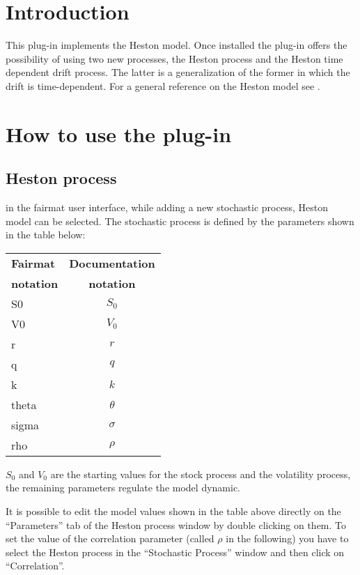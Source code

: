 \newcommand{\pluginName}{Heston Model}
\newcommand{\pluginVersion}{1.0.9}





\PluginTitle{\pluginName}{\pluginVersion}

\section{Introduction}
This plug-in implements the Heston model. Once installed the plug-in offers the possibility of using two new processes, the Heston process and the Heston time dependent drift process. 
The latter is a generalization of the former in which the drift is time-dependent. For a general reference on the Heston model see \cite{Heston:ClosedFormSol}.

\section{How to use the plug-in}

\subsection{Heston process}
in the fairmat user interface, while adding a new stochastic process, Heston model can be selected.
The stochastic process is defined by the parameters shown in the table below:
\begin{center}
\begin{tabular}{|l|c|}
  \hline
\textbf{Fairmat}&\textbf{Documentation}\\
\textbf{notation}&\textbf{notation}\\
                     \hline
 S0     & $S_0$\\
 V0     & $V_0$\\
 r  & $r$\\
 q  & $q$\\
 k      & $k$ \\
 theta  & $\theta$\\
 sigma  & $\sigma$\\
rho & $\rho$ \\ 
   \hline
\end{tabular}
\end{center}
$S_0$ and $V_0$ are the starting values for the stock process and the volatility process, the remaining parameters regulate the model dynamic.

It is possible to edit the model values shown in the table above directly on the ``Parameters'' tab of the Heston process window by double clicking on them. To set the value of the correlation parameter (called $\rho$ in the following) you have to select the Heston process in the ``Stochastic Process'' window and then click on ``Correlation''.

